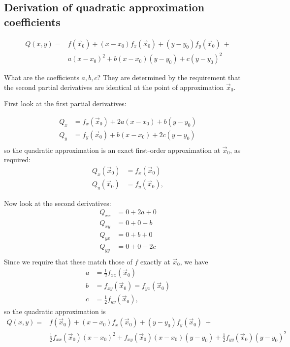 \subsection{Derivation of quadratic approximation coefficients}
\begin{align*}
Q(x, y) =
&f(\vec x_0) + (x - x_0)f_x(\vec x_0) +
(y - y_0)f_y(\vec x_0) ~+ \\
&a(x - x_0)^2 +
b(x - x_0)(y - y_0) +
c(y - y_0)^2
\end{align*}

What are the coefficients $a,b,c$? They are determined by the requirement that
the second partial derivatives are identical at the point of approximation
$\vec x_0$.

First look at the first partial derivatives:

\begin{align*}
  Q_x &= f_x(\vec x_0) + 2a(x - x_0) + b(y - y_0)\\
  Q_y &= f_y(\vec x_0) + b(x - x_0) + 2c(y - y_0)\\
\end{align*}
so the quadratic approximation is an exact first-order approximation at $\vec x_0$, as required:
\begin{align*}
  Q_x(\vec x_0) &= f_x(\vec x_0) \\
  Q_y(\vec x_0) &= f_y(\vec x_0),
\end{align*}

Now look at the second derivatives:
\begin{align*}
  Q_{xx} &= 0 + 2a + 0 \\
  Q_{xy} &= 0 + 0 + b \\
  Q_{yx} &= 0 + b + 0 \\
  Q_{yy} &= 0 + 0 + 2c \\
\end{align*}
Since we require that these match those of $f$ exactly at $\vec x_0$, we have
\begin{align*}
  a &= \frac{1}{2} f_{xx}(\vec x_0) \\
  b &= f_{xy}(\vec x_0) = f_{yx}(\vec x_0) \\
  c &= \frac{1}{2} f_{yy}(\vec x_0),
\end{align*}
so the quadratic approximation is
\begin{align*}
Q(x, y) =
&f(\vec x_0) + (x - x_0)f_x(\vec x_0) +
(y - y_0)f_y(\vec x_0) ~+ \\
&\frac{1}{2} f_{xx}(\vec x_0)(x - x_0)^2 +
f_{xy}(\vec x_0)(x - x_0)(y - y_0) +
\frac{1}{2} f_{yy}(\vec x_0)(y - y_0)^2
\end{align*}
